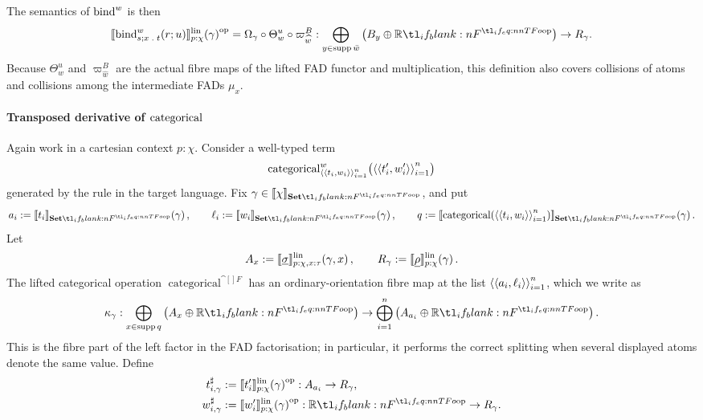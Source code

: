 \documentclass[11pt,a4paper]{article}
\theoremstyle{definition}
\theoremstyle{remark}
\providecommand{\supp}{\operatorname{supp}}
\providecommand{\lintype}[1]{\underline{#1}}
\providecommand{\setint}[1]{\llbracket #1\rrbracket_{\Set}}
\providecommand{\linint}[2]{\llbracket #1\rrbracket_{#2}^{\mathrm{lin}}}
\providecommand{\categ}{\operatorname{categorical}}
\begin{document}
The semantics of \(\opn[b]{bind}^{w}\) is then
\begin{equation}
  \label{eq:appendix-target-language-transpose-derivative-of-bind}
  \opmor[p]{
    \fn[n]{
      \linint{
        \fn[n]{ \opn[b]{bind}^{w}_{s; x \; . \; t}}{ r ; u }
      }{p : \chi}
    }{ \gamma }
  }
  =
  \Omega_{\gamma}
  \circ
  \Theta^{u}_{w}
  \circ
  \varpi^{B}_{\widehat w}
  :
  \bigoplus_{y\in\supp \bar w}\left(B_{y}\oplus\R\right)
  \to R_{\gamma}.
\end{equation}
Because \(\Theta^{u}_{w}\) and \(\varpi^{B}_{\widehat w}\) are the actual fibre maps of the lifted FAD functor and multiplication, this definition also covers collisions of atoms and collisions among the intermediate FADs \(\mu_x\).

\paragraph{Transposed derivative of \( \opn[b]{categorical} \)}
Again work in a cartesian context \(p:\chi\).  Consider a well-typed term
\[
  \fn[n]{
    \opn[b]{categorical}^{w}_{
      \tuple{\tuple{t_{i},w_{i}}}_{i=1}^{n}
    }
  }{
    \tuple{\tuple{t_{i}',w_{i}'}}_{i=1}^{n}
  }
\]
generated by the rule in the target language.  Fix \(\gamma\in\setint{\chi}\), and put
\[
  a_{i}:=\fn[n]{\setint{t_{i}}}{\gamma},
  \qquad
  \ell_{i}:=\fn[n]{\setint{w_{i}}}{\gamma},
  \qquad
  q:=
  \fn[n]{\setint{
    \fn[n]{\opn[b]{categorical}}{
      \tuple{\tuple{t_{i},w_{i}}}_{i=1}^{n}
    }
  }}{\gamma}.
\]
Let
\[
  A_{x}:=\fn[n]{\linint{\lintype{\sigma}}{p:\chi,x:\tau}}{\gamma,x},
  \qquad
  R_{\gamma}:=\fn[n]{\linint{\lintype{\rho}}{p:\chi}}{\gamma}.
\]
The lifted categorical operation \(\categ^{\cat[]{F}}\) has an ordinary-orientation fibre map at the list \(\left\langle \left\langle a_{i},\ell_{i}\right\rangle\right\rangle_{i=1}^{n}\), which we write as
\begin{equation*}
  \kappa_{\gamma}:
  \bigoplus_{x\in\supp q}\left(A_{x}\oplus\R\right)
  \to
  \bigoplus_{i=1}^{n}\left(A_{a_i}\oplus\R\right).
\end{equation*}
This is the fibre part of the left factor in the FAD factorisation; in particular, it performs the correct splitting when several displayed atoms denote the same value.  Define
\begin{equation*}
  \begin{aligned}
    t^{\sharp}_{i,\gamma}
    &:={}
    \opmor[p]{
      \fn[n]{\linint{t_{i}'}{p:\chi}}{\gamma}
    }
    : A_{a_i}\to R_{\gamma},
    \\
    w^{\sharp}_{i,\gamma}
    &:={}
    \opmor[p]{
      \fn[n]{\linint{w_{i}'}{p:\chi}}{\gamma}
    }
    : \R\to R_{\gamma}.
  \end{aligned}
\end{equation*}
\end{document}
